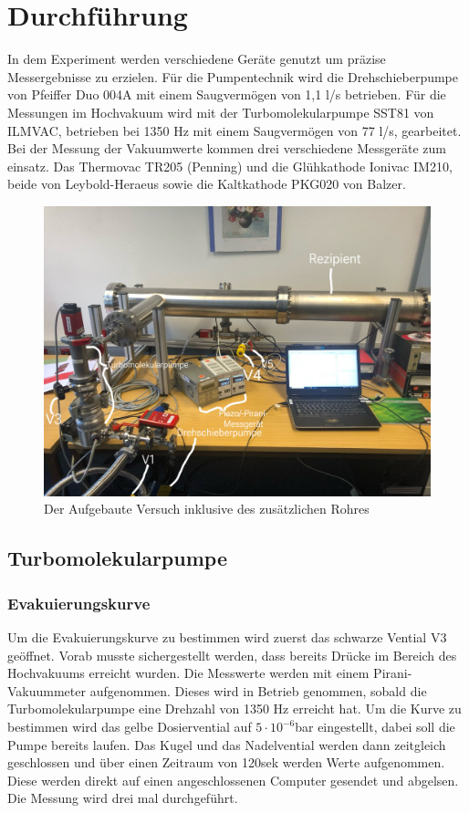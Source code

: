 \section{Durchführung}
\label{sec:Durchführung}

In dem Experiment werden verschiedene Geräte genutzt um präzise Messergebnisse zu erzielen.
Für die Pumpentechnik wird die Drehschieberpumpe von Pfeiffer Duo 004A mit einem Saugvermögen von 1,1 l/s betrieben.
Für die Messungen im Hochvakuum wird mit der Turbomolekularpumpe SST81 von ILMVAC, betrieben bei 1350 Hz 
mit einem Saugvermögen von 77 l/s, gearbeitet. Bei der Messung der Vakuumwerte kommen drei verschiedene 
Messgeräte zum einsatz. Das Thermovac TR205 (Penning) und die Glühkathode Ionivac IM210, beide von Leybold-Heraeus
sowie die Kaltkathode PKG020 von Balzer.


\begin{figure}
    \includegraphics[width=\textwidth]{bilder/Aufbau.jpeg}
    \caption{Der Aufgebaute Versuch inklusive des zusätzlichen Rohres}
\end{figure}


\subsection{Turbomolekularpumpe}
\subsubsection{Evakuierungskurve}


Um die Evakuierungskurve zu bestimmen wird zuerst das schwarze Vential V3 geöffnet.
Vorab musste sichergestellt werden, dass bereits Drücke im Bereich des Hochvakuums erreicht wurden.
Die Messwerte werden  mit einem Pirani-Vakuummeter aufgenommen.
Dieses wird in Betrieb genommen, sobald die Turbomolekularpumpe eine Drehzahl von 1350 Hz erreicht hat.
Um die Kurve zu bestimmen wird das gelbe Dosiervential auf $5\cdot 10^{-6}$bar eingestellt, dabei soll die Pumpe bereits laufen.
Das Kugel und das Nadelvential werden dann zeitgleich geschlossen und über einen Zeitraum von 120sek werden Werte
aufgenommen. Diese werden direkt auf einen angeschlossenen Computer gesendet und abgelsen.
Die Messung wird drei mal durchgeführt. 

